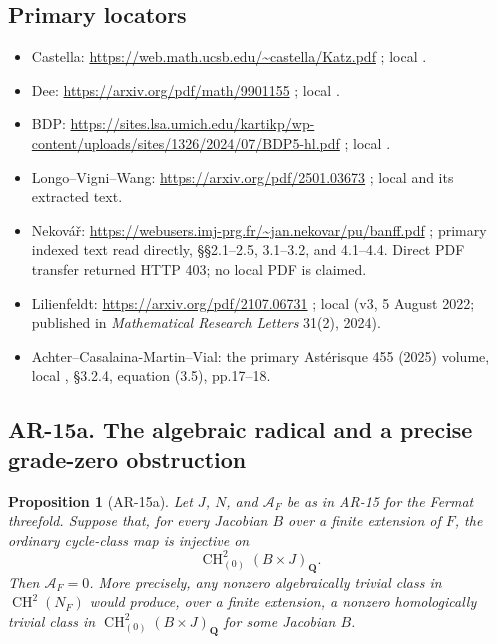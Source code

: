 \documentclass[11pt,a4paper]{article}
\newtheorem{proposition}[theorem]{Proposition}
\providecommand{\tightlist}{\setlength{\itemsep}{0pt}\setlength{\parskip}{0pt}}
\begin{document}
\subsection{Primary locators}\label{primary-locators}

\begin{itemize}
\tightlist
\item
  Castella: \url{https://web.math.ucsb.edu/~castella/Katz.pdf}
  ; local .
\item
  Dee: \url{https://arxiv.org/pdf/math/9901155} ; local
  .
\item
  BDP:
  \url{https://sites.lsa.umich.edu/kartikp/wp-content/uploads/sites/1326/2024/07/BDP5-hl.pdf}
  ; local .
\item
  Longo--Vigni--Wang: \url{https://arxiv.org/pdf/2501.03673} ; local
  \newline{} and its extracted text.
\item
  Nekovář:
  \url{https://webusers.imj-prg.fr/~jan.nekovar/pu/banff.pdf} ;
  primary indexed text read directly, §§2.1--2.5, 3.1--3.2, and
  4.1--4.4. Direct PDF transfer returned HTTP 403; no local PDF is
  claimed.
\item
  Lilienfeldt: \url{https://arxiv.org/pdf/2107.06731} ; local
   (v3, 5 August 2022; published
  in \emph{Mathematical Research Letters} 31(2), 2024).
\item
  Achter--Casalaina-Martin--Vial: the primary Astérisque 455 (2025)
  volume, local , §3.2.4,
  equation (3.5), pp.17--18.
\end{itemize}
\subsection*{AR-15a. The algebraic radical and a precise grade-zero obstruction}

\begin{proposition}[AR-15a]
Let \(J\), \(N\), and \(\mathcal A_F\) be as in AR-15 for the Fermat
threefold. Suppose that, for every Jacobian \(B\) over a finite extension
of \(F\), the ordinary cycle-class map is injective on
\[
             \operatorname{CH}^2_{(0)}(B\times J)_{\mathbf Q}.
             \tag{AR15a.1}
\]
Then \(\mathcal A_F=0\). More precisely, any nonzero algebraically
trivial class in \(\operatorname{CH}^2(N_F)\) would produce, over a
finite extension, a nonzero homologically trivial class in
\(\operatorname{CH}^2_{(0)}(B\times J)_{\mathbf Q}\) for some Jacobian
\(B\).
\end{proposition}
\end{document}
